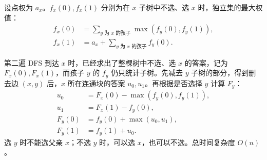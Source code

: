 设点权为 $a_x$。$f_x(0),f_x(1)$ 分别为在 $x$ 子树中不选、选 $x$ 时，独立集的最大权值：
\[
\begin{aligned}
f_x(0)&=\sum_{y\text{ 为 }x\text{ 的孩子}}\max(f_y(0),f_y(1)),\\
f_x(1)&=a_x+\sum_{y\text{ 为 }x\text{ 的孩子}}f_y(0).
\end{aligned}
\]

第二遍 DFS 到达 $x$ 时，已经求出了整棵树中不选、选 $x$ 的答案，记为 $F_x(0),F_x(1)$，而孩子 $y$ 的 $f_y$ 仍只统计子树。先减去 $y$ 子树的部分，得到删去边 $(x,y)$ 后，$x$ 所在连通块的答案 $u_0,u_1$。再根据是否选择 $y$ 计算 $F_y$：
\[
\begin{aligned}
u_0&=F_x(0)-\max(f_y(0),f_y(1)),\\
u_1&=F_x(1)-f_y(0),\\
F_y(0)&=f_y(0)+\max(u_0,u_1),\\
F_y(1)&=f_y(1)+u_0.
\end{aligned}
\]
选 $y$ 时不能选父亲 $x$；不选 $y$ 时，可以选 $x$，也可以不选。总时间复杂度 $O(n)$。
